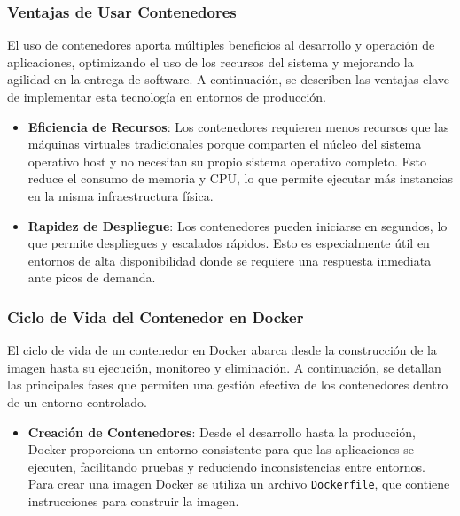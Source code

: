 {            \subsubsection{Ventajas de Usar Contenedores}
                El uso de contenedores aporta múltiples beneficios al desarrollo y operación de aplicaciones, optimizando el uso de los recursos del sistema y mejorando la agilidad en la entrega de software. A continuación, se describen las ventajas clave de implementar esta tecnología en entornos de producción.

                \begin{itemize}
                    \item \textbf{Eficiencia de Recursos}: Los contenedores requieren menos recursos que las máquinas virtuales tradicionales porque comparten el núcleo del sistema operativo host y no necesitan su propio sistema operativo completo. Esto reduce el consumo de memoria y CPU, lo que permite ejecutar más instancias en la misma infraestructura física.
                    
                    \item \textbf{Rapidez de Despliegue}: Los contenedores pueden iniciarse en segundos, lo que permite despliegues y escalados rápidos. Esto es especialmente útil en entornos de alta disponibilidad donde se requiere una respuesta inmediata ante picos de demanda.
                \end{itemize}
            
            \subsubsection{Ciclo de Vida del Contenedor en Docker}
                El ciclo de vida de un contenedor en Docker abarca desde la construcción de la imagen hasta su ejecución, monitoreo y eliminación. A continuación, se detallan las principales fases que permiten una gestión efectiva de los contenedores dentro de un entorno controlado.

                \begin{itemize}
                    \item \textbf{Creación de Contenedores}: Desde el desarrollo hasta la producción, Docker proporciona un entorno consistente para que las aplicaciones se ejecuten, facilitando pruebas y reduciendo inconsistencias entre entornos. Para crear una imagen Docker se utiliza un archivo \texttt{Dockerfile}, que contiene instrucciones para construir la imagen.
                

\end{itemize}}
